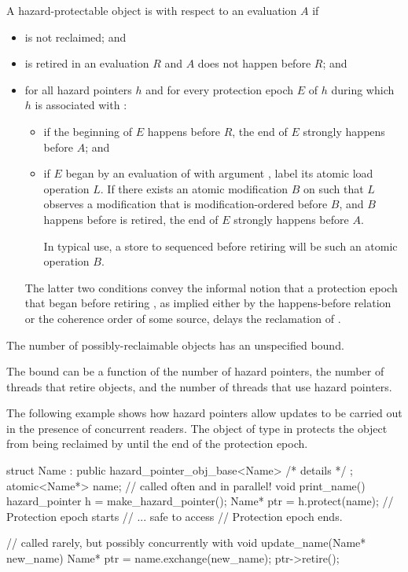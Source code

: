 \pnum
A hazard-protectable object  is 
with respect to an evaluation $A$ if
\begin{itemize}
\item
{} is not reclaimed; and
\item
{} is retired in an evaluation $R$ and
$A$ does not happen before $R$; and
\item
for all hazard pointers $h$ and for every protection epoch $E$ of $h$
during which $h$ is associated with :
\begin{itemize}
\item
if the beginning of $E$ happens before $R$,
the end of $E$ strongly happens before $A$; and
\item
if $E$ began by an evaluation of  with argument ,
label its atomic load operation $L$.
If there exists an atomic modification $B$ on 
such that $L$ observes a modification that is modification-ordered before $B$, and
$B$ happens before  is retired,
the end of $E$ strongly happens before $A$.
\begin{note}
In typical use, a store to  sequenced before retiring 
will be such an atomic operation $B$.
\end{note}
\end{itemize}
\begin{note}
The latter two conditions convey the informal notion
that a protection epoch that began before retiring ,
as implied either by the happens-before relation or
the coherence order of some source,
delays the reclamation of .
\end{note}
\end{itemize}

\pnum
The number of possibly-reclaimable objects has an unspecified bound.
\begin{note}
The bound can be a function of the number of hazard pointers,
the number of threads that retire objects, and
the number of threads that use hazard pointers.
\end{note}
\begin{example}
The following example shows how hazard pointers allow updates to be carried out
in the presence of concurrent readers.
The object of type  in 
protects the object  from being reclaimed by 
until the end of the protection epoch.
\begin{codeblock}
struct Name : public hazard_pointer_obj_base<Name> { /* details */ };
atomic<Name*> name;
// called often and in parallel!
void print_name() {
  hazard_pointer h = make_hazard_pointer();
  Name* ptr = h.protect(name);          // Protection epoch starts
  // ... safe to access 
}                                       // Protection epoch ends.

// called rarely, but possibly concurrently with 
void update_name(Name* new_name) {
  Name* ptr = name.exchange(new_name);
  ptr->retire();
}
\end{codeblock}
\end{example}

